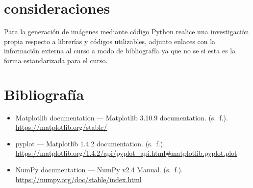 \documentclass[]{article}
\begin{document}
\section{consideraciones}
Para la generación de imágenes mediante código Python realice una investigación propia respecto a librerías y códigos utilizables, adjunto enlaces con la información externa al curso a modo de bibliografía ya que no se si esta es la forma estandarizada para el curso.

\section{Bibliografía}
\begin{itemize}
	\item Matplotlib documentation — Matplotlib 3.10.9 documentation. (s. f.). \url{https://matplotlib.org/stable/}
	\item pyplot — Matplotlib 1.4.2 documentation. (s. f.). \url{https://matplotlib.org/1.4.2/api/pyplot_api.html#matplotlib.pyplot.plot}
	\item NumPy documentation — NumPy v2.4 Manual. (s. f.). \url{https://numpy.org/doc/stable/index.html}

\end{itemize}
\end{document}
